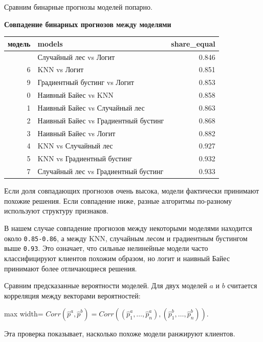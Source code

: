 \documentclass[11pt]{article}
\newcounter{none}
\begin{document}
    Сравним бинарные прогнозы моделей попарно.

    \textbf{Совпадение бинарных прогнозов между моделями}

{\def\LTcaptype{none} %
\begin{longtable}[]{@{}rlr@{}}
\toprule\noalign{}
модель & models & share\_equal \\
\midrule\noalign{}
\endhead
\bottomrule\noalign{}
\endlastfoot
8 & Случайный лес vs Логит & 0.846 \\
6 & KNN vs Логит & 0.851 \\
9 & Градиентный бустинг vs Логит & 0.853 \\
0 & Наивный Байес vs KNN & 0.858 \\
1 & Наивный Байес vs Случайный лес & 0.863 \\
2 & Наивный Байес vs Градиентный бустинг & 0.868 \\
3 & Наивный Байес vs Логит & 0.882 \\
4 & KNN vs Случайный лес & 0.927 \\
5 & KNN vs Градиентный бустинг & 0.932 \\
7 & Случайный лес vs Градиентный бустинг & 0.933 \\
\end{longtable}
}

    Если доля совпадающих прогнозов очень высока, модели фактически
принимают похожие решения. Если совпадение ниже, разные алгоритмы
по-разному используют структуру признаков.

В нашем случае совпадение прогнозов между некоторыми моделями находится
около \texttt{0.85-0.86}, а между KNN, случайным лесом и градиентным
бустингом выше \texttt{0.93}. Это означает, что сильные нелинейные
модели часто классифицируют клиентов похожим образом, но логит и наивный
Байес принимают более отличающиеся решения.

    Сравним предсказанные вероятности моделей. Для двух моделей \(a\) и
\(b\) считается корреляция между векторами вероятностей:

\begin{center}
\begin{adjustbox}{max width=\linewidth}
\(\displaystyle Corr(\hat p^a, \hat p^b) = Corr\left((\hat p_1^a, \ldots, \hat p_n^a), (\hat p_1^b, \ldots, \hat p_n^b)\right).\)
\end{adjustbox}
\end{center}

Эта проверка показывает, насколько похоже модели ранжируют клиентов.
\end{document}
